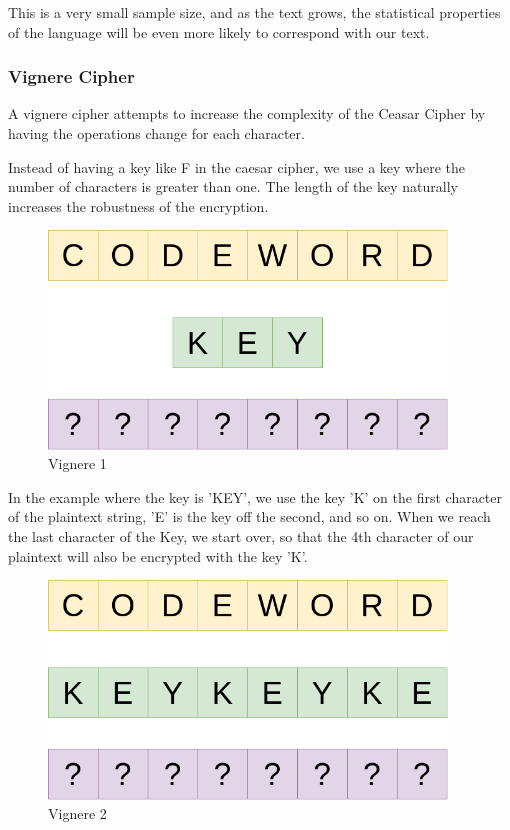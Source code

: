 \documentclass{article}
\begin{document}
 This is a very small sample size, and as the text grows, the statistical properties of the language will be even more likely to correspond with our text. 

\subsubsection{Vignere Cipher}

A vignere cipher attempts to increase the complexity of the Ceasar Cipher by having the operations change for each character. 

Instead of having a key like F in the caesar cipher, we use a key where the number of characters is greater than one. The length of the key naturally increases the robustness of the encryption. 

\begin{figure}[H]
 \centering
  \includegraphics[width=300pt]{img/vigneredraw1.png}
 \caption{Vignere 1}
 \end{figure}

In the example where the key is 'KEY', we use the key 'K' on the first character of the plaintext string, 'E' is the key off the second, and so on. When we reach the last character of the Key, we start over, so that the 4th character of our plaintext will also be encrypted with the key 'K'.

\begin{figure}[H]
 \centering
  \includegraphics[width=300pt]{img/vigneredraw2.png}
 \caption{Vignere 2}
 \end{figure}
\end{document}
